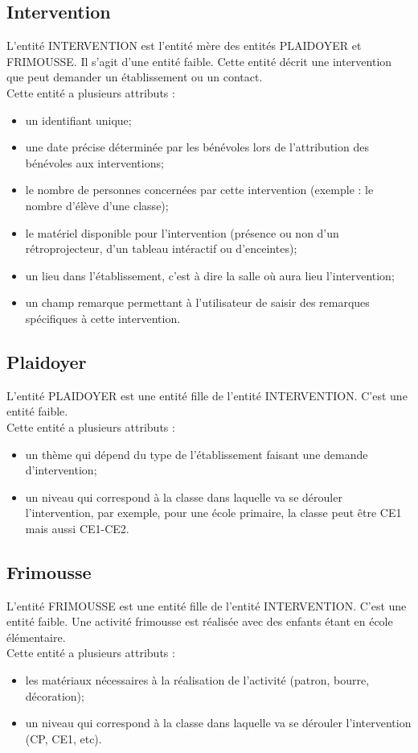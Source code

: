 \documentclass[asi, sansVersion]{picInsa}
\begin{document}
\subsection*{Intervention}
L'entité INTERVENTION est l'entité mère des entités PLAIDOYER et FRIMOUSSE. Il s'agit d'une entité faible. Cette entité décrit une intervention que peut demander un établissement ou un contact. \\
Cette entité a plusieurs attributs :
\begin{itemize}
\item un identifiant unique;
\item une date précise déterminée par les bénévoles lors de l'attribution des bénévoles aux interventions;
\item le nombre de personnes concernées par cette intervention (exemple : le nombre d'élève d'une classe);
\item le matériel disponible pour l'intervention (présence ou non d'un rétroprojecteur, d'un tableau intéractif ou d'enceintes);
\item un lieu dans l'établissement, c'est à dire la salle où aura lieu l'intervention;
\item un champ remarque permettant à l'utilisateur de saisir des remarques spécifiques à cette intervention. 
\end{itemize}

\subsection*{Plaidoyer}
L'entité PLAIDOYER est une entité fille de l'entité INTERVENTION. C'est une entité faible. \\
Cette entité a plusieurs attributs : 
\begin{itemize}
\item un thème qui dépend du type de l'établissement faisant une demande d'intervention;
\item un niveau qui correspond à la classe dans laquelle va se dérouler l'intervention, par exemple, pour une école primaire, la classe peut être CE1 mais aussi CE1-CE2.
\end{itemize}

\subsection*{Frimousse}
L'entité FRIMOUSSE est une entité fille de l'entité INTERVENTION. C'est une entité faible. Une activité frimousse est réalisée avec des enfants étant en école élémentaire. \\
Cette entité a plusieurs attributs :
\begin{itemize}
\item les matériaux nécessaires à la réalisation de l'activité (patron, bourre, décoration); %
\item un niveau qui correspond à la classe dans laquelle va se dérouler l'intervention (CP, CE1, etc).
\end{itemize}
\end{document}
